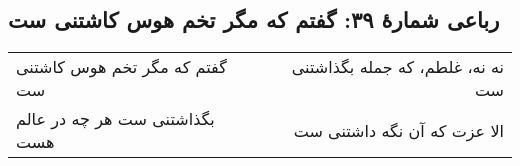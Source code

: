 \begin{center}
\section*{رباعی شمارهٔ ۳۹: گفتم که مگر تخم هوس کاشتنی ست}
\label{sec:039}
\begin{longtable}{l p{0.5cm} r}
گفتم که مگر تخم هوس کاشتنی ست
&&
نه نه، غلطم، که جمله بگذاشتنی ست
\\
بگذاشتنی ست هر چه در عالم هست
&&
الا عزت که آن نگه داشتنی ست
\\
\end{longtable}
\end{center}
